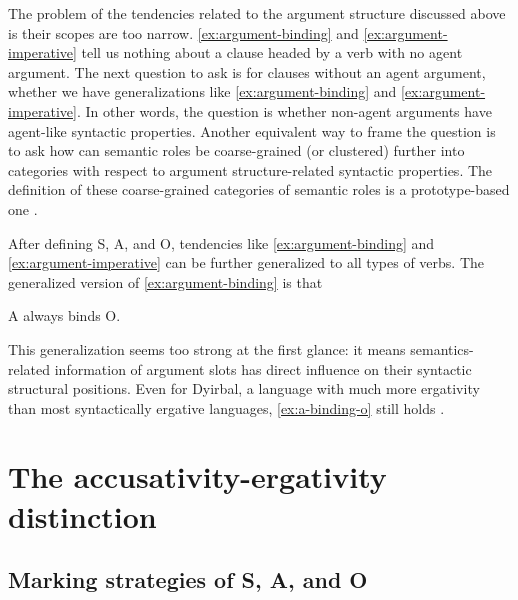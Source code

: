 \documentclass{article}
\newcommand*{\citesec}[1]{\S~{#1}}
\begin{document}
The problem of the tendencies related to the argument structure discussed above 
is their scopes are too narrow.
\eqref{ex:argument-binding} and \eqref{ex:argument-imperative} tell us nothing about 
a clause headed by a verb with no agent argument.
The next question to ask is for clauses without an agent argument,
whether we have generalizations like \eqref{ex:argument-binding} and \eqref{ex:argument-imperative}.
In other words, the question is whether non-agent arguments have agent-like syntactic properties.
Another equivalent way to frame the question is to ask 
how can semantic roles be coarse-grained (or clustered) further into categories 
with respect to argument structure-related syntactic properties.
The definition of these coarse-grained categories of semantic roles is a prototype-based one
\citep[\citesec{5.2}]{comrie1989language}.

After defining S, A, and O, tendencies like \eqref{ex:argument-binding} and \eqref{ex:argument-imperative}
can be further generalized to all types of verbs.
The generalized version of \eqref{ex:argument-binding} is that 
\begin{exe} 
    \ex \label{ex:a-binding-o} A always binds O.
\end{exe}   
This generalization seems too strong at the first glance:
it means semantics-related information of argument slots has 
direct influence on their syntactic structural positions.
Even for Dyirbal, a language with much more ergativity than most syntactically ergative languages, 
\eqref{ex:a-binding-o} still holds \citep{van2003syntactic}.

\section{The accusativity-ergativity distinction}\label{sec:morphologcal-ergativity}

\subsection{Marking strategies of S, A, and O}\label{sec:sao-marking}
\end{document}
